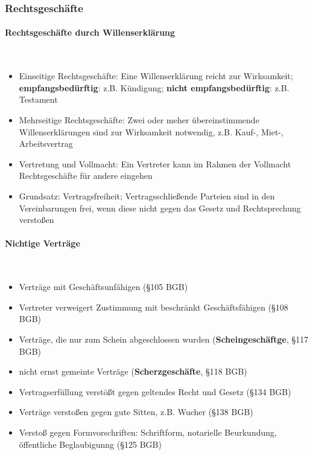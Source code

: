\subsubsection{Rechtsgeschäfte}

\paragraph{Rechtsgeschäfte durch Willenserklärung}~\\

\begin{itemize}
\setlength\itemsep{0em}
	\item Einseitige Rechtsgeschäfte: Eine Willenserklärung reicht zur Wirksamkeit; {\bf empfangsbedürftig}: z.B. Kündigung; {\bf nicht empfangsbedürftig}: z.B. Testament
	\item Mehrseitige Rechtsgeschäfte: Zwei oder meher übereinstimmende Willenserklärungen sind zur Wirksamkeit notwendig, z.B. Kauf-, Miet-, Arbeitsvertrag
	\item Vertretung und Vollmacht: Ein Vertreter kann im Rahmen der Vollmacht Rechtsgeschäfte für andere eingehen
	\item Grundsatz: Vertragsfreiheit; Vertragsschließende Parteien sind in den Vereinbarungen frei, wenn diese nicht gegen das Gesetz und Rechtsprechung verstoßen
\end{itemize}

\paragraph{Nichtige Verträge}~\\

\begin{itemize}
\setlength\itemsep{0em}
	\item Verträge mit Geschäftsunfähigen (§105 BGB)
	\item Vertreter verweigert Zustimmung mit beschränkt Geschäftsfähigen (§108 BGB)
	\item Verträge, die nur zum Schein abgeschlossen wurden ({\bf Scheingeschäftge}, §117 BGB)
	\item nicht ernst gemeinte Verträge ({\bf Scherzgeschäfte}, §118 BGB)
	\item Vertragserfüllung verstößt gegen geltendes Recht und Gesetz (§134 BGB)
	\item Verträge verstoßen gegen gute Sitten, z.B. Wucher (§138 BGB)
	\item Verstoß gegen Formvorschriften: Schriftform, notarielle Beurkundung, öffentliche Beglaubigunng (§125 BGB)
\end{itemize}


